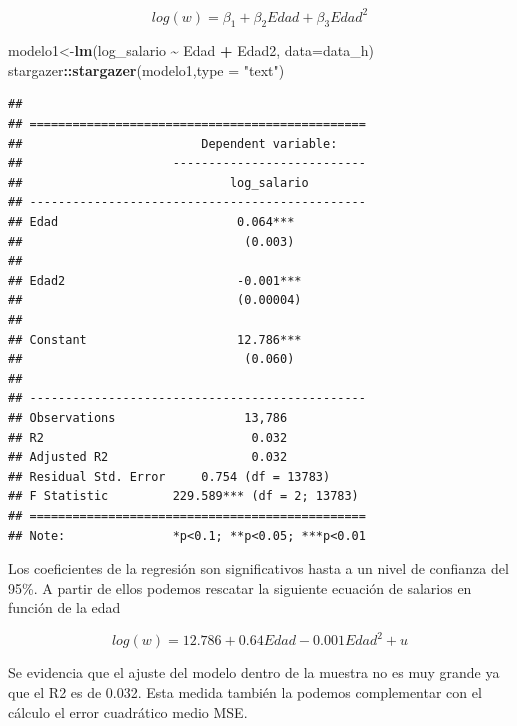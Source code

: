 \documentclass[
]{article}
\newenvironment{Shaded}{\begin{snugshade}}{\end{snugshade}}
\newcommand{\AttributeTok}[1]{\textcolor[rgb]{0.13,0.29,0.53}{#1}}
\newcommand{\FunctionTok}[1]{\textcolor[rgb]{0.13,0.29,0.53}{\textbf{#1}}}
\newcommand{\NormalTok}[1]{#1}
\newcommand{\OtherTok}[1]{\textcolor[rgb]{0.56,0.35,0.01}{#1}}
\newcommand{\SpecialCharTok}[1]{\textcolor[rgb]{0.81,0.36,0.00}{\textbf{#1}}}
\newcommand{\StringTok}[1]{\textcolor[rgb]{0.31,0.60,0.02}{#1}}
\begin{document}
\[log(w) = \beta_{1} + \beta_{2}Edad + \beta_{3}Edad^2\]

\begin{Shaded}
\begin{Highlighting}[]
\NormalTok{modelo1}\OtherTok{\textless{}{-}}\FunctionTok{lm}\NormalTok{(log\_salario }\SpecialCharTok{\textasciitilde{}}\NormalTok{  Edad }\SpecialCharTok{+}\NormalTok{ Edad2,}
\AttributeTok{data=}\NormalTok{data\_h)}
\NormalTok{stargazer}\SpecialCharTok{::}\FunctionTok{stargazer}\NormalTok{(modelo1,}\AttributeTok{type =} \StringTok{"text"}\NormalTok{)}
\end{Highlighting}
\end{Shaded}

\begin{verbatim}
## 
## ===============================================
##                         Dependent variable:    
##                     ---------------------------
##                             log_salario        
## -----------------------------------------------
## Edad                         0.064***          
##                               (0.003)          
##                                                
## Edad2                        -0.001***         
##                              (0.00004)         
##                                                
## Constant                     12.786***         
##                               (0.060)          
##                                                
## -----------------------------------------------
## Observations                  13,786           
## R2                             0.032           
## Adjusted R2                    0.032           
## Residual Std. Error     0.754 (df = 13783)     
## F Statistic         229.589*** (df = 2; 13783) 
## ===============================================
## Note:               *p<0.1; **p<0.05; ***p<0.01
\end{verbatim}

Los coeficientes de la regresión son significativos hasta a un nivel de
confianza del 95\%. A partir de ellos podemos rescatar la siguiente
ecuación de salarios en función de la edad

\[log(w) = 12.786 + 0.64 Edad - 0.001 Edad^2 + u\]

Se evidencia que el ajuste del modelo dentro de la muestra no es muy
grande ya que el R2 es de 0.032. Esta medida también la podemos
complementar con el cálculo el error cuadrático medio MSE.
\end{document}
